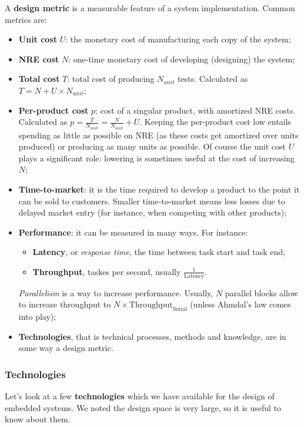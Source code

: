 \documentclass[a4paper,11pt]{article}
\begin{document}
A \textbf{design metric} is a measurable feature of a system implementation.
Common metrics are:
\begin{itemize}
	\item \textbf{Unit cost} $U$: the monetary cost of manufacturing each copy of the system;
	\item \textbf{NRE cost} $N$: one-time monetary cost of developing (designing) the system;
	\item \textbf{Total cost} $T$: total cost of producing $N_{unit}$ tests. Calculated as $T = N + U \times N_{unit}$;
	\item \textbf{Per-product cost} $p$: cost of a singular product, with amortized NRE costs. Calculated as $p = \frac{T}{N_{unit}} = \frac{N}{N_{unit}} + U$. Keeping the per-product cost low entails spending as little as possible on NRE (as these costs get amortized over units produced) or producing as many units as possible. Of course the unit cost $U$ plays a significant role: lowering is sometimes useful at the cost of increasing $N$;
	\item \textbf{Time-to-market}: it is the time required to develop a product to the point it can be sold to customers. Smaller time-to-market means less losses due to delayed market entry (for instance, when competing with other products);
	\item \textbf{Performance}: it can be measured in many ways. For instance:
	      \begin{itemize}
		      \item \textbf{Latency}, or \textit{response time}, the time between task start and task end;
		      \item \textbf{Throughput}, taskes per second, usually $\frac{1}{\text{Latency}}$.
	      \end{itemize}
	      \textit{Parallelism} is a way to increase performance. Usually, $N$ parallel blocks allow to increase throughput to $N \times \text{Throughput}_\text{Serial}$ (unless Ahmdal's law comes into play);
	\item \textbf{Technologies}, that is technical processes, methods and knowledge, are in some way a design metric.
\end{itemize}

\subsubsection{Technologies}

Let's look at a few \textbf{technologies} which we have available for the design of embedded systems.
We noted the design space is very large, so it is useful to know about them.
\end{document}
